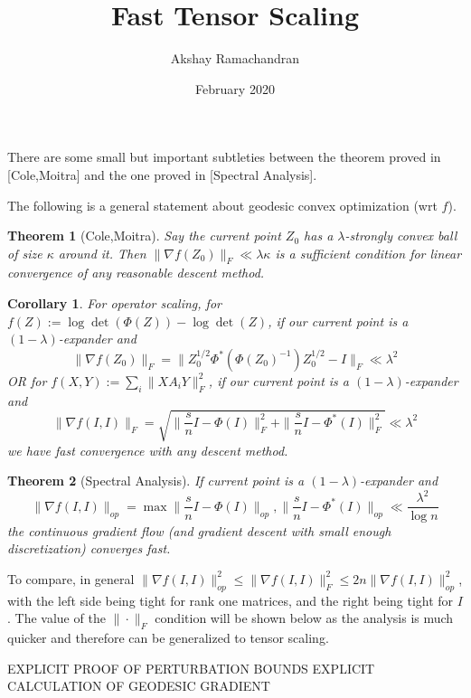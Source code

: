 \documentclass{article}
\title{Fast Tensor Scaling}
\author{Akshay Ramachandran }
\date{February 2020}
\newtheorem{theorem}{Theorem}
\newtheorem{corollary}{Corollary}
\begin{document}
\maketitle

There are some small but important subtleties between the theorem proved in [Cole,Moitra] and the one proved in [Spectral Analysis]. 

The following is a general statement about geodesic convex optimization (wrt $f$).
\begin{theorem} [Cole,Moitra]
Say the current point $Z_{0}$ has a $\lambda$-strongly convex ball of size $\kappa$ around it. Then $\|\nabla f(Z_{0})\|_{F} \ll \lambda \kappa$ is a sufficient condition for linear convergence of any reasonable descent method. 
\end{theorem}

\begin{corollary}
For operator scaling, for $f(Z) := \log\det(\Phi(Z)) - \log\det(Z)$, if our current point is a $(1 - \lambda)$-expander and 
\[ \|\nabla f(Z_{0})\|_{F} = \|Z_{0}^{1/2} \Phi^{*}( \Phi(Z_{0})^{-1} ) Z_{0}^{1/2} - I\|_{F} \ll \lambda^{2}   \]
\emph{OR} for $f(X,Y) := \sum_{i} \|X A_{i} Y\|_{F}^{2}$, if our current point is a $(1 - \lambda)$-expander and 
\[ \|\nabla f(I,I)\|_{F} = \sqrt{\|\frac{s}{n} I - \Phi(I)\|_{F}^{2} + \|\frac{s}{n} I - \Phi^{*}(I) \|_{F}^{2}} \ll \lambda^{2}     \]
we have fast convergence with any descent method. 
\end{corollary}

\begin{theorem} [Spectral Analysis]If current point is a $(1 - \lambda)$-expander and 
\[  \|\nabla f(I,I)\|_{op} = \max{ \|\frac{s}{n} I - \Phi(I)\|_{op}, \|\frac{s}{n} I - \Phi^{*}(I) \|_{op} } \ll \frac{\lambda^{2}}{\log n}  \]
the continuous gradient flow (and gradient descent with small enough discretization) converges fast. 
\end{theorem}

To compare, in general $\|\nabla f(I,I)\|_{op}^{2} \leq \|\nabla f(I,I)\|_{F}^{2} \leq 2n \|\nabla f(I,I)\|_{op}^{2}$, with the left side being tight for rank one matrices, and the right being tight for $I$. The value of the $\|\cdot\|_{F}$ condition will be shown below as the analysis is much quicker and therefore can be generalized to tensor scaling. 


EXPLICIT PROOF OF PERTURBATION BOUNDS
EXPLICIT CALCULATION OF GEODESIC GRADIENT
\end{document}
